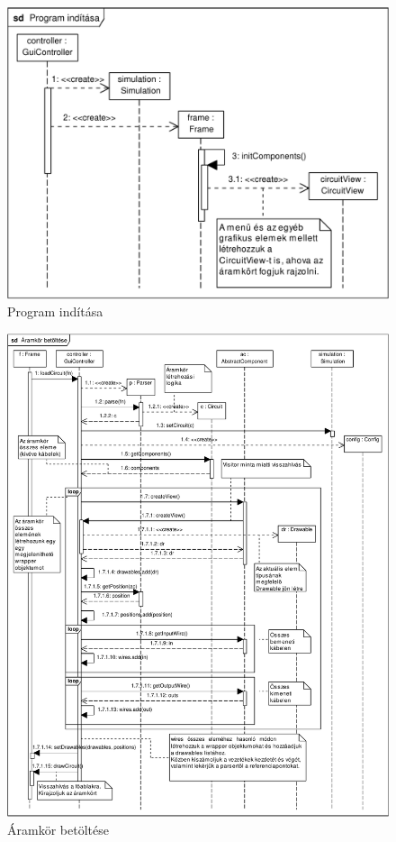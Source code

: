 \begin{figure}[h]
\begin{center}
\includegraphics[width=17cm]{chapters/chapter11/pdfs/1_program_start.pdf}
\caption{Program indítása}
\label{fig:program_start}
\end{center}
\end{figure}

\begin{figure}[h]
\begin{center}
\includegraphics[width=17cm]{chapters/chapter11/pdfs/2_loadcircuit.pdf}
\caption{Áramkör betöltése}
\label{fig:loadcircuit}
\end{center}
\end{figure}


